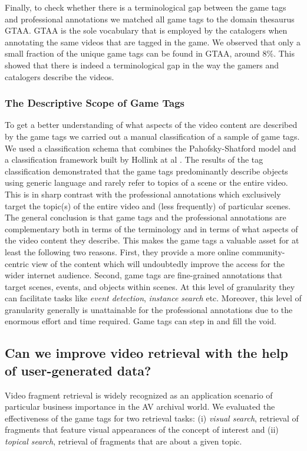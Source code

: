 Finally, to check whether there is a terminological gap between the game tags and professional annotations we matched all game tags to the domain thesaurus GTAA. GTAA is the sole vocabulary that is employed by the catalogers when annotating the same videos that are tagged in the game. We observed that only a small fraction of the unique game tags can be found in GTAA, around $8\%$. This showed that there is indeed a terminological gap in the way the gamers and catalogers describe the videos.

\subsubsection{The Descriptive Scope of Game Tags}
To get a better understanding of what aspects of the video content are described by the game tags we carried out a manual classification of a sample of game tags. We used a classification schema that combines the Pahofsky-Shatford model and a classification framework built by Hollink at al \cite{laurapaper}. The results of the tag classification demonstrated that the game tags predominantly describe objects using generic language and rarely refer to topics of a scene or the entire video. This is in sharp contrast with the professional annotations which exclusively target the topic(s) of the entire video and (less frequently) of particular scenes. The general conclusion is that game tags and the professional annotations are complementary both in terms of the terminology and in terms of what aspects of the video content they describe. This makes the game tags a valuable asset for at least the following two reasons. First, they provide a more online community-centric view of the content which will undoubtedly improve the access for the wider internet audience. Second, game tags are fine-grained annotations that target scenes, events, and objects within scenes. At this level of granularity they can facilitate tasks like \textit{event detection}, \textit{instance search} etc. Moreover, this level of granularity generally is unattainable for the professional annotations due to the enormous effort and time required. Game tags can step in and fill the void.

\subsection{Can we improve video retrieval with the help of user-generated data?}\label{conclusion:search}
Video fragment retrieval is widely recognized as an application scenario of particular business importance in the AV archival world. We evaluated the effectiveness of the game tags for two retrieval tasks: (i) \textit{visual search}, retrieval of fragments that feature visual appearances of the concept of interest and (ii) \textit{topical search}, retrieval of fragments that are about a given topic.

